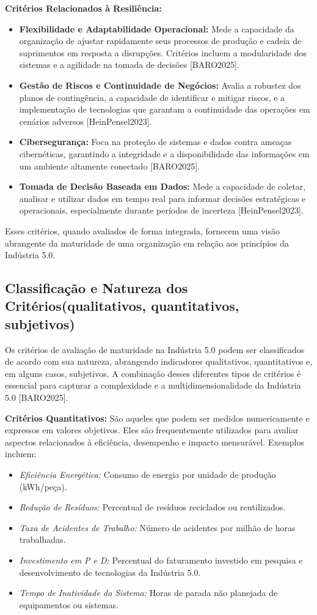 \textbf{Critérios Relacionados à Resiliência:}
\begin{itemize}
    \item \textbf{Flexibilidade e Adaptabilidade Operacional:} Mede a capacidade da organização de ajustar rapidamente seus processos de produção e cadeia de suprimentos em resposta a disrupções. Critérios incluem a modularidade dos sistemas e a agilidade na tomada de decisões [BARO2025].
    \item \textbf{Gestão de Riscos e Continuidade de Negócios:} Avalia a robustez dos planos de contingência, a capacidade de identificar e mitigar riscos, e a implementação de tecnologias que garantam a continuidade das operações em cenários adversos [HeinPensel2023].
    \item \textbf{Cibersegurança:} Foca na proteção de sistemas e dados contra ameaças cibernéticas, garantindo a integridade e a disponibilidade das informações em um ambiente altamente conectado [BARO2025].
    \item \textbf{Tomada de Decisão Baseada em Dados:} Mede a capacidade de coletar, analisar e utilizar dados em tempo real para informar decisões estratégicas e operacionais, especialmente durante períodos de incerteza [HeinPensel2023].
\end{itemize}

Esses critérios, quando avaliados de forma integrada, fornecem uma visão abrangente da maturidade de uma organização em relação aos princípios da Indústria 5.0.

\subsection{Classificação e Natureza dos Critérios(qualitativos, quantitativos, subjetivos)}

Os critérios de avaliação de maturidade na Indústria 5.0 podem ser classificados de acordo com sua natureza, abrangendo indicadores qualitativos, quantitativos e, em alguns casos, subjetivos. A combinação desses diferentes tipos de critérios é essencial para capturar a complexidade e a multidimensionalidade da Indústria 5.0 [BARO2025].

\textbf{Critérios Quantitativos:}
São aqueles que podem ser medidos numericamente e expressos em valores objetivos. Eles são frequentemente utilizados para avaliar aspectos relacionados à eficiência, desempenho e impacto mensurável. Exemplos incluem:
\begin{itemize}
    \item \textit{Eficiência Energética:} Consumo de energia por unidade de produção (kWh/peça).
    \item \textit{Redução de Resíduos:} Percentual de resíduos reciclados ou reutilizados.
    \item \textit{Taxa de Acidentes de Trabalho:} Número de acidentes por milhão de horas trabalhadas.
    \item \textit{Investimento em P e D:} Percentual do faturamento investido em pesquisa e desenvolvimento de tecnologias da Indústria 5.0.
    \item \textit{Tempo de Inatividade do Sistema:} Horas de parada não planejada de equipamentos ou sistemas.
\end{itemize}

